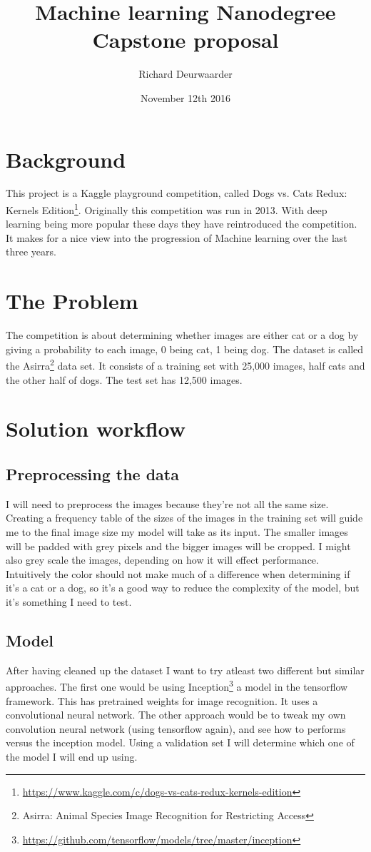 \documentclass[11pt]{article}
\title{\textbf{Machine learning Nanodegree\\ Capstone proposal}}
\author{Richard Deurwaarder}
\date{November 12th 2016}
\begin{document}
\maketitle

\section{Background}
This project is a Kaggle playground competition, called Dogs vs. Cats Redux: Kernels Edition\footnote{\url{https://www.kaggle.com/c/dogs-vs-cats-redux-kernels-edition}}. Originally this competition was run in 2013. With deep learning being more popular these days they have reintroduced the competition. It makes for a nice view into the  progression of Machine learning over the last three years.
\section{The Problem}
The competition is about determining whether images are either cat or a dog by giving a probability to each image, 0 being cat, 1 being dog. The dataset is called the Asirra\footnote{Asirra: Animal Species Image Recognition for Restricting Access} data set. It consists of a training set with 25,000 images, half cats and the other half of dogs. The test set has 12,500 images.
\section{Solution workflow}
\subsection{Preprocessing the data}
I will need to preprocess the images because they're not all the same size. Creating a frequency table of the sizes of the images in the training set will guide me to the final image size my model will take as its input. The smaller images will be padded with grey pixels and the bigger images will be cropped. I might also grey scale the images, depending on how it will effect performance. Intuitively the color should not make much of a difference when determining if it's a cat or a dog, so it's a good way to reduce the complexity of the model, but it's something I need to test.

\subsection{Model}
After having cleaned up the dataset I want to try atleast two different but similar approaches. The first one would be using Inception\footnote{\url{https://github.com/tensorflow/models/tree/master/inception}} a model in the tensorflow framework. This has pretrained weights for image recognition. It uses a convolutional neural network.
The other approach would be to tweak my own convolution neural network (using tensorflow again), and see how to performs versus the inception model. Using a validation set I will determine which one of the model I will end up using.
\end{document}
